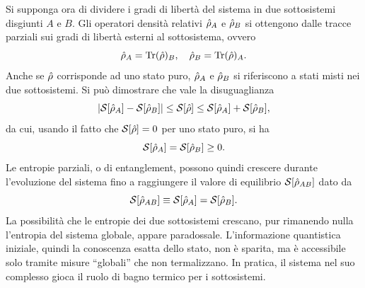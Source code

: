 Si supponga ora di dividere i gradi di libertà del sistema in due sottosistemi disgiunti $A$ e $B$. Gli operatori densità relativi $\hat{\rho}_A$ e $\hat{\rho}_B$ si ottengono dalle tracce parziali sui gradi di libertà esterni al sottosistema, ovvero
\begin{equation}
    \hat{\rho}_A = \mathrm{Tr}(\hat{\rho})_B,\quad \hat{\rho}_B = \mathrm{Tr}(\hat{\rho})_A.
\end{equation}
Anche se $\hat{\rho}$ corrisponde ad uno stato puro, $\hat{\rho}_A$ e $\hat{\rho}_B$ si riferiscono a stati misti nei due sottosistemi. Si può dimostrare che vale la disuguaglianza 
\begin{equation}
    |\mathcal{S}[\hat{\rho}_A] - \mathcal{S}[\hat{\rho}_B]| \le \mathcal{S}[\hat{\rho}] \le \mathcal{S}[\hat{\rho}_A] + \mathcal{S}[\hat{\rho}_B],
\end{equation}
da cui, usando il fatto che $\mathcal{S}[\hat{\rho}] = 0$ per uno stato puro, si ha
\begin{equation}
    \mathcal{S}[\hat{\rho}_A] = \mathcal{S}[\hat{\rho}_B] \ge 0.
\end{equation}
Le entropie parziali, o di entanglement, possono quindi crescere durante l'evoluzione del sistema fino a raggiungere il valore di equilibrio $\mathcal{S}[\hat{\rho}_{AB}]$ dato da
\begin{equation}
    \mathcal{S}[\hat{\rho}_{AB}] \equiv \mathcal{S}[\hat{\rho}_A] = \mathcal{S}[\hat{\rho}_B].
\end{equation}
La possibilità che le entropie dei due sottosistemi crescano, pur rimanendo nulla l'entropia del sistema globale, appare paradossale.  L'informazione quantistica iniziale, quindi la conoscenza esatta dello stato, non è sparita, ma è accessibile solo tramite misure ``globali'' che non termalizzano. In pratica, il sistema nel suo complesso gioca il ruolo di bagno termico per i sottosistemi.
